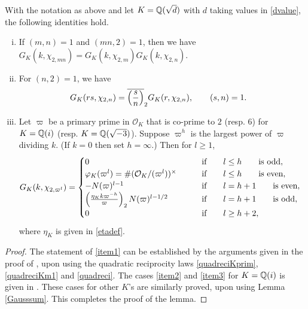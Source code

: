 \documentclass[twoside,leqno,10pt, A4]{amsart}
\begin{document}
\begin{lemma} \label{GausssumMult}
  With the notation as above and let $K=\mathbb Q(\sqrt{d})$  with $d$ taking values in \eqref{dvalue}, the following identities hold.

\begin{enumerate} [(i)]
\item \label{item1} If $(m,n)=1$ and $(mn, 2)=1$, then we have $G_K(k,\chi_{2, mn})=G_K(k,\chi_{2, m})G_K(k,\chi_{2, n})$.

\item \label{item2}For $(n,2)=1$, we have
\begin{align*}
   G_K(rs,\chi_{2, n}) & = \overline{\left(\frac{s}{n}\right)}_2 G_K(r,\chi_{2, n}), \qquad (s,n)=1.
\end{align*}
\item \label{item3} Let $\varpi$ be a primary prime in $\mathcal{O}_K$ that is co-prime to $2$ (resp. $6$) for $K=\mathbb Q(i)$ (resp. $K=\mathbb Q(\sqrt{-3})$).
Suppose $\varpi^{h}$ is the largest power of $\varpi$ dividing $k$. (If $k = 0$ then set $h =
\infty$.) Then for $l \geq 1$,
\begin{align*}
 G_K(k, \chi_{2, \varpi^l})& =\begin{cases}
    0 \qquad & \text{if} \qquad l \leq h \qquad \text{is odd},\\
    \varphi_K(\varpi^l)=\#(\mathcal{O}_K/(\varpi^l))^{\times} \qquad & \text{if} \qquad l \leq h \qquad \text{is even},\\
    -N(\varpi)^{l-1} & \text{if} \qquad l= h+1 \qquad \text{is even},\\
    \left(\frac{\eta_K k\varpi^{-h}}{\varpi}\right)_2 N(\varpi)^{l-1/2} \qquad & \text{if} \qquad l= h+1 \qquad \text{is odd},\\
    0 \qquad & \text{if} \qquad l \geq h+2,
\end{cases}
\end{align*}
  where $\eta_K$ is given in \eqref{etadef}.
\end{enumerate}
\end{lemma}
\begin{proof}
    The statement of \eqref{item1} can be established by the arguments given in the proof of \cite[Lemma 2.3]{sound1}, upon using the quadratic reciprocity laws \eqref{quadreciKprim},  \eqref{quadreciKm1} and \eqref{quadreci}. The cases \eqref{item2} and \eqref{item3} for $K=\mathbb Q(i)$ is
given in \cite[Lemma 2.2]{G&Zhao4}. These cases for other $K$'s are similarly proved, upon using Lemma \ref{Gausssum}.
 This completes the proof of the lemma.
\end{proof}
\end{document}
